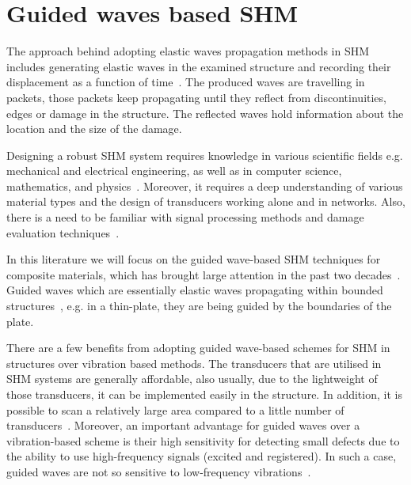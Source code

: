 \section[Guided waves based SHM]{Guided waves based SHM}
\label{sec22}
The approach behind adopting elastic waves propagation methods in SHM includes generating elastic waves in the examined structure and recording their displacement as a function of time~\cite{Ostachowicz2012}. 
The produced waves are travelling in packets, those packets keep propagating until 
they reflect from discontinuities, edges or damage in the structure. The reflected waves hold information about the location and the size of the damage. 

Designing a robust SHM system requires knowledge in various scientific fields e.g. mechanical and electrical engineering, as well as in computer science, mathematics, and physics~\cite{Willberg2013}.
Moreover, it requires a deep understanding of various material types and the design of transducers working alone and in networks. 
Also, there is a need to be familiar with signal processing methods and damage evaluation techniques~\cite{Willberg2013}.

In this literature we will focus on the guided wave-based SHM techniques for composite materials, which has brought large attention in the past two decades~\cite{Mitra2016}.
Guided waves which are essentially elastic waves propagating within bounded 
structures~\cite{Mitra2016}, e.g. in a thin-plate, they are being guided by the boundaries of the plate. 

There are a few benefits from adopting guided wave-based sche\-mes for SHM in structures over vibration based methods. 
The transducers that are utilised in SHM systems are generally affordable, also usually, due to the lightweight of those transducers, it can be implemented easily in the structure.
In addition, it is possible to scan a relatively large area compared to a little number of transducers~\cite{Mitra2016}. 
Moreover, an important advantage for guided waves over a vibration-based scheme 
is their high sensitivity for detecting small defects due to the ability to use high-frequency signals (excited and registered).
In such a case, guided waves are not so sensitive to low-frequency vibrations~\cite{Mitra2016,Croxford2007}.

